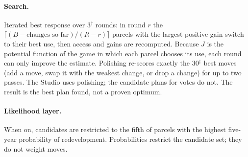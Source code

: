 \documentclass[10pt]{article}
\begin{document}
\paragraph{Search.} Iterated best response over 3$^\dagger$ rounds: in round $r$ the
$\lceil(B - \text{changes so far})/(R - r)\rceil$ parcels with the largest positive gain switch to their best use, then
access and gains are recomputed. Because $J$ is the potential function of the game in which each parcel chooses its use,
each round can only improve the estimate. Polishing re-scores exactly the 30$^\dagger$ best moves (add a move,
swap it with the weakest change, or drop a change) for up to two passes. The Studio uses polishing; the candidate plans
for votes do not. The result is the best plan found, not a proven optimum.

\paragraph{Likelihood layer.} When on, candidates are restricted to the fifth of parcels with the highest five-year
probability of redevelopment. Probabilities restrict the candidate set; they do not weight moves.
\end{document}
